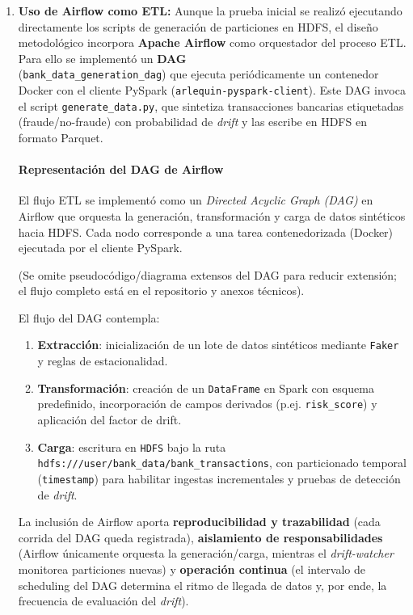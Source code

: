 \begin{enumerate}
    \item \textbf{Uso de Airflow como ETL:}
    Aunque la prueba inicial se realizó ejecutando directamente los scripts de generación de particiones en HDFS, 
    el diseño metodológico incorpora \textbf{Apache Airflow} como orquestador del proceso ETL. 
    Para ello se implementó un \textbf{DAG} \\ (\texttt{bank\_data\_generation\_dag}) que ejecuta periódicamente 
    un contenedor Docker con el cliente PySpark (\texttt{arlequin-pyspark-client}). 
    Este DAG invoca el script \texttt{generate\_data.py}, que sintetiza transacciones bancarias etiquetadas (fraude/no-fraude) con 
    probabilidad de \textit{drift} y las escribe en HDFS en formato Parquet.

   \paragraph{Representación del DAG de Airflow}
    El flujo ETL se implementó como un \textit{Directed Acyclic Graph (DAG)} en Airflow que orquesta la generación, transformación y carga de datos sintéticos hacia HDFS. Cada nodo corresponde a una tarea contenedorizada (Docker) ejecutada por el cliente PySpark.
    
    (Se omite pseudocódigo/diagrama extensos del DAG para reducir extensión; el flujo completo está en el repositorio y anexos técnicos).

    El flujo del DAG contempla:
    \begin{enumerate}
        \item \textbf{Extracción}: inicialización de un lote de datos sintéticos mediante \texttt{Faker} y reglas de estacionalidad.
        \item \textbf{Transformación}: creación de un \texttt{DataFrame} en Spark con esquema predefinido, 
              incorporación de campos derivados (p.ej. \texttt{risk\_score}) y aplicación del factor de drift.
        \item \textbf{Carga}: escritura en \texttt{HDFS} bajo la ruta \texttt{hdfs:///user/bank\_data/bank\_transactions}, 
              con particionado temporal (\texttt{timestamp}) para habilitar ingestas incrementales y pruebas de 
              detección de \textit{drift}.
    \end{enumerate}

    La inclusión de Airflow aporta \textbf{reproducibilidad y trazabilidad} (cada corrida del DAG queda registrada), 
    \textbf{aislamiento de responsabilidades} (Airflow únicamente orquesta la generación/carga, mientras el \textit{drift-watcher} 
    monitorea particiones nuevas) y \textbf{operación continua} (el intervalo de scheduling del DAG determina el ritmo 
    de llegada de datos y, por ende, la frecuencia de evaluación del \textit{drift}).
    

\end{enumerate}
